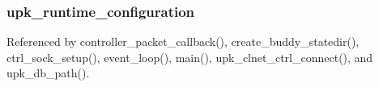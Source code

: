 \subsubsection[{upk\_\-runtime\_\-configuration}]{ {\bf upk\_\-runtime\_\-configuration}}\label{group__functions_gaf7638ba77297c6ad954805d92fa33c13}


Referenced by controller\_\-packet\_\-callback(), create\_\-buddy\_\-statedir(), ctrl\_\-sock\_\-setup(), event\_\-loop(), main(), upk\_\-clnet\_\-ctrl\_\-connect(), and upk\_\-db\_\-path().

